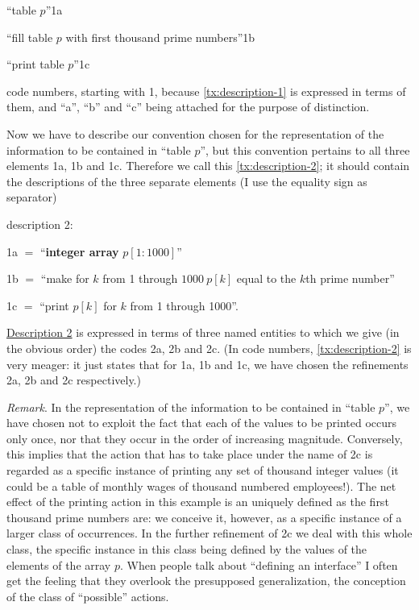 \noindent
``table $p$''\hfill 1a

\noindent
``fill table $p$ with first thousand prime numbers''\hfill 1b

\noindent
``print table $p$''\hfill 1c

\noindent
code numbers, starting with 1, because \ref{tx:description-1} is expressed in terms of them, and ``a'', ``b'' and ``c'' being attached for the purpose of distinction.

Now we have to describe our convention chosen for the representation of the information to be contained in ``table $p$'', but this convention pertains to all three elements 1a, 1b and 1c. Therefore we call this \ref{tx:description-2}; it should contain the descriptions of the three separate elements (I use the equality sign as separator)
\medskip

\noindent
description 2:
\nopagebreak

\noindent
1a $=$ ``\textbf{integer array} $p[1 : 1000]$''

\noindent
1b $=$ ``make for $k$ from 1 through $1000\ p[k]$ equal to the $k$th prime number''

\noindent
1c $=$ ``print $p[k]$ for $k$ from 1 through 1000''.

\hyperref[tx:description-2]{Description 2} is expressed in terms of three named entities to which we give (in the obvious order) the codes 2a, 2b and 2c. (In code numbers, \ref{tx:description-2} is very meager: it just states that for 1a, 1b and 1c, we have chosen the refinements 2a, 2b and 2c respectively.)

\noindent
\textit{Remark}. In the representation of the information to be contained in ``table $p$'', we have chosen not to exploit the fact that each of the values to be printed occurs only once, nor that they occur in the order of increasing magnitude. Conversely, this implies that the action that has to take place under the name of 2c is regarded as a specific instance of printing any set of thousand integer values (it could be a table of monthly wages of thousand numbered employees!). The net effect of the printing action in this example is an uniquely defined as the first thousand prime numbers are: we conceive it, however, as a specific instance of a larger class of occurrences. In the further refinement of 2c we deal with this whole class, the specific instance in this class being defined by the values of the elements of the array $p$. When people talk about ``defining an interface'' I often get the feeling that they overlook the presupposed generalization, the conception of the class of ``possible'' actions.

